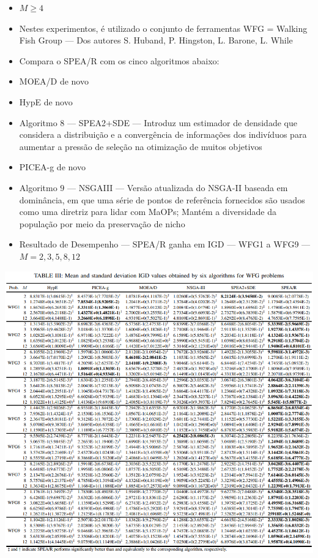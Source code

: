 \documentclass{rbfin}
\begin{document}
\vspace{6mm}

\begin{itemize}
  \item $M \ge 4$
  \item Nestes experimentos, é utilizado o conjunto de ferramentas WFG = Walking Fish Group --- Dos autores S. Huband, P. Hingston, L. Barone, L. While
  \item Compara o SPEA/R com os cinco algoritmos abaixo:
  \item MOEA/D de novo
  \item HypE de novo
  \item Algoritmo $8$ --- SPEA2+SDE --- Introduz um estimador de densidade que considera a distribuição e a convergência de informações dos indivíduos para aumentar a pressão de seleção na otimização de muitos objetivos
  \item PICEA-g de novo
  \item Algoritmo $9$ --- NSGAIII --- Versão atualizada do NSGA-II baseada em dominância, em que uma série de pontos de referência fornecidos são usados como uma diretriz para lidar com MaOPs; Mantém a diversidade da população por meio da preservação de nicho
\end{itemize}

\newpage

\begin{itemize}
  \item Resultado de Desempenho --- SPEA/R ganha em IGD --- WFG1 a WFG9 --- $M = 2,3,5,8,12$
\end{itemize}

\begin{center}
\includegraphics[scale=0.85]{table3}
\end{center}
\end{document}
